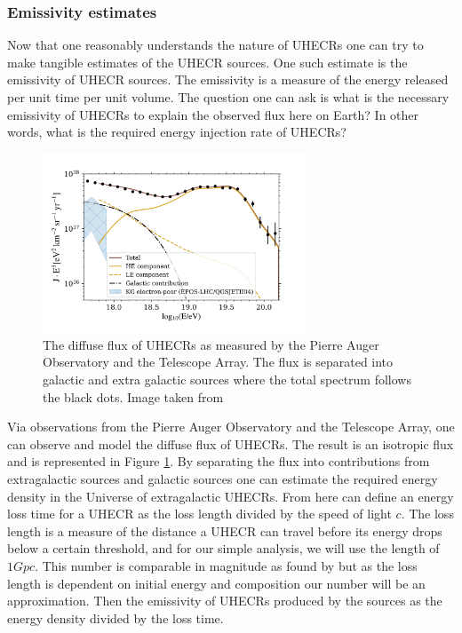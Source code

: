 \subsubsection{Emissivity estimates}
\label{sec:emmisivity}

Now that one reasonably understands the nature of UHECRs one can try to make tangible estimates of the UHECR sources. One such
estimate is the emissivity of UHECR sources. The emissivity is a measure of the energy released per unit time per unit volume. The question 
one can ask is what is the necessary emissivity of UHECRs to explain the observed flux here on Earth? In other words, what is the required energy injection rate of UHECRs?


\begin{figure}
    \centering
    \includegraphics[width = 0.7\textwidth]{UHECRs.png}
    \caption{The diffuse flux of UHECRs as measured by the Pierre Auger Observatory and the Telescope Array. The flux is separated into galactic and extra galactic sources where the total spectrum follows the black dots. Image taken from \cite{Abdul_Halim_2023}}
    \label{fig:flux_UHECRs}
\end{figure}

Via observations from the Pierre Auger Observatory and the Telescope Array, one can observe and model the diffuse flux of UHECRs. The result is an isotropic flux and is represented in Figure \ref{fig:flux_UHECRs}.  By separating the 
flux into contributions from extragalactic sources and galactic sources one can estimate the required energy density in the Universe of extragalactic UHECRs. From here can define an energy loss time for a UHECR as the loss length divided by the speed of light $c$.
 The loss length is a measure of the distance a UHECR can travel before its energy drops below a certain threshold, and for our simple analysis, we will use the length of $1 Gpc$. This number is comparable in magnitude
as found by \cite{Stanev_2009} but as the loss length is dependent on initial energy and composition our number will be an approximation. 
Then the emissivity of UHECRs produced by the sources as the energy density divided by the loss time.

